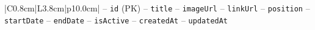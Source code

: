 \begin{center}
\begin{longtable}{|C{0.8cm}|L{3.8cm}|p{10.0cm}|}
\hspace*{1em}-- \texttt{id} (PK) \newline
\hspace*{1em}-- \texttt{title} \newline
\hspace*{1em}-- \texttt{image\allowbreak Url} \newline
\hspace*{1em}-- \texttt{link\allowbreak Url} \newline
\hspace*{1em}-- \texttt{position} \newline
\hspace*{1em}-- \texttt{start\allowbreak Date} \newline
\hspace*{1em}-- \texttt{end\allowbreak Date} \newline
\hspace*{1em}-- \texttt{is\allowbreak Active} \newline
\hspace*{1em}-- \texttt{created\allowbreak At} \newline
\hspace*{1em}-- \texttt{updated\allowbreak At} \\
\hline
\end{longtable}\addtocounter{table}{-1}
\end{center}
